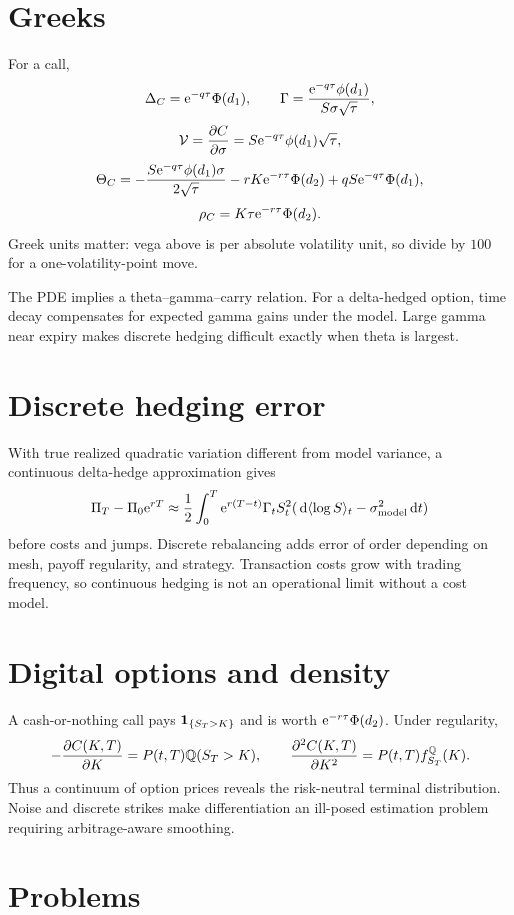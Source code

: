 \section{Greeks}

For a call,
\[
\Delta_C=\mathrm e^{-q\tau}\Phi(d_1),\qquad
\Gamma=\frac{\mathrm e^{-q\tau}\phi(d_1)}{S\sigma\sqrt\tau},
\]
\[
\mathcal V=\frac{\partial C}{\partial\sigma}
=S\mathrm e^{-q\tau}\phi(d_1)\sqrt\tau,
\]
\[
\Theta_C=
-\frac{S\mathrm e^{-q\tau}\phi(d_1)\sigma}{2\sqrt\tau}
-rK\mathrm e^{-r\tau}\Phi(d_2)
+qS\mathrm e^{-q\tau}\Phi(d_1),
\]
\[
\rho_C=K\tau\mathrm e^{-r\tau}\Phi(d_2).
\]
Greek units matter: vega above is per absolute volatility unit, so divide by $100$
for a one-volatility-point move.

The PDE implies a theta--gamma--carry relation. For a delta-hedged option, time decay
compensates for expected gamma gains under the model. Large gamma near expiry makes
discrete hedging difficult exactly when theta is largest.

\section{Discrete hedging error}

With true realized quadratic variation different from model variance, a continuous
delta-hedge approximation gives
\[
\Pi_T-\Pi_0\mathrm e^{rT}
\approx\frac12\int_0^T
\mathrm e^{r(T-t)}\Gamma_tS_t^2
(\,\mathrm d\langle\log S\rangle_t-\sigma_{\mathrm{model}}^2\,\mathrm d t)
\]
before costs and jumps. Discrete rebalancing adds error of order depending on mesh,
payoff regularity, and strategy. Transaction costs grow with trading frequency, so
continuous hedging is not an operational limit without a cost model.

\section{Digital options and density}

A cash-or-nothing call pays $\mathbf 1_{\{S_T>K\}}$ and is worth
$\mathrm e^{-r\tau}\Phi(d_2)$. Under regularity,
\[
-\frac{\partial C(K,T)}{\partial K}
=P(t,T)\mathbb Q(S_T>K),\qquad
\frac{\partial^2 C(K,T)}{\partial K^2}
=P(t,T)f^\mathbb Q_{S_T}(K).
\]
Thus a continuum of option prices reveals the risk-neutral terminal distribution.
Noise and discrete strikes make differentiation an ill-posed estimation problem
requiring arbitrage-aware smoothing.

\section{Problems}

